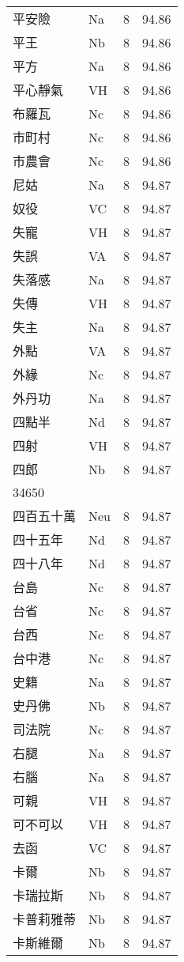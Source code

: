 \documentclass[twocolumn]{book}
\begin{document}
\begin{supertabular}{llrr}
平安險 & Na & 8 &  94.86\\
平王 & Nb & 8 &  94.86\\
平方 & Na & 8 &  94.86\\
平心靜氣 & VH & 8 &  94.86\\
布羅瓦 & Nc & 8 &  94.86\\
市町村 & Nc & 8 &  94.86\\
市農會 & Nc & 8 &  94.86\\
尼姑 & Na & 8 &  94.87\\
奴役 & VC & 8 &  94.87\\
失寵 & VH & 8 &  94.87\\
失誤 & VA & 8 &  94.87\\
失落感 & Na & 8 &  94.87\\
失傳 & VH & 8 &  94.87\\
失主 & Na & 8 &  94.87\\
外點 & VA & 8 &  94.87\\
外緣 & Nc & 8 &  94.87\\
外丹功 & Na & 8 &  94.87\\
四點半 & Nd & 8 &  94.87\\
四射 & VH & 8 &  94.87\\
四郎 & Nb & 8 &  94.87\\
34650\\
四百五十萬 & Neu & 8 &  94.87\\
四十五年 & Nd & 8 &  94.87\\
四十八年 & Nd & 8 &  94.87\\
台島 & Nc & 8 &  94.87\\
台省 & Nc & 8 &  94.87\\
台西 & Nc & 8 &  94.87\\
台中港 & Nc & 8 &  94.87\\
史籍 & Na & 8 &  94.87\\
史丹佛 & Nb & 8 &  94.87\\
司法院 & Nc & 8 &  94.87\\
右腿 & Na & 8 &  94.87\\
右腦 & Na & 8 &  94.87\\
可親 & VH & 8 &  94.87\\
可不可以 & VH & 8 &  94.87\\
去函 & VC & 8 &  94.87\\
卡爾 & Nb & 8 &  94.87\\
卡瑞拉斯 & Nb & 8 &  94.87\\
卡普莉雅蒂 & Nb & 8 &  94.87\\
卡斯維爾 & Nb & 8 &  94.87\\

\end{supertabular}
\end{document}
